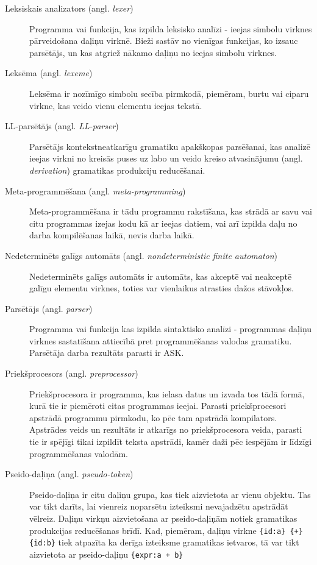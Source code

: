 \begin{description}
\item[Leksiskais analizators (angl. \emph{lexer})]
Programma vai funkcija, kas izpilda leksisko analīzi - ieejas simbolu virknes pārveidošana daļiņu virknē. Bieži sastāv no vienīgas funkcijas, ko izsauc parsētājs, un kas atgriež nākamo daļiņu no ieejas simbolu virknes.

\item[Leksēma (angl. \emph{lexeme})]
Leksēma ir nozīmīgo simbolu secība pirmkodā, piemēram, burtu vai ciparu virkne, kas veido vienu elementu ieejas tekstā.

\item[LL-parsētājs (angl. \emph{LL-parser})]
Parsētājs kontekstneatkarīgu gramatiku apakškopas parsēšanai, kas analizē ieejas virkni no kreisās puses uz labo un veido kreiso atvasinājumu (angl. \emph{derivation}) gramatikas produkciju reducēšanai.

\item[Meta-programmēšana (angl. \emph{meta-programming})]
Meta-programmēšana ir tādu programmu rakstīšana, kas strādā ar savu vai citu programmas izejas kodu kā ar ieejas datiem, vai arī izpilda daļu no darba kompilēšanas laikā, nevis darba laikā.

\item[Nedeterminēts galīgs automāts (angl. \emph{nondeterministic finite automaton})]
Nedeterminēts galīgs automāts ir automāts, kas akceptē vai neakceptē galīgu elementu virknes, toties var vienlaikus atrasties dažos stāvokļos.~\cite{Hopcroft:IntroAutomataTheory}

\item[Parsētājs (angl. \emph{parser})]
Programma vai funkcija kas izpilda sintaktisko analīzi - programmas daļiņu virknes sastatīšana attiecībā pret programmēšanas valodas gramatiku. Parsētāja darba rezultāts parasti ir ASK.

\item[Priekšprocesors (angl. \emph{preprocessor})]
Priekšprocesora ir programma, kas ielasa datus un izvada tos tādā formā, kurā tie ir piemēroti citas programmas ieejai. Parasti priekšprocesori apstrādā programmu pirmkodu, ko pēc tam apstrādā kompilators. Apstrādes veids un rezultāts ir atkarīgs no priekšprocesora veida, parasti tie ir spējīgi tikai izpildīt teksta apstrādi, kamēr daži pēc iespējām ir līdzīgi programmēšanas valodām.

\item[Pseido-daļiņa (angl. \emph{pseudo-token})]
Pseido-daļiņa ir citu daļiņu grupa, kas tiek aizvietota ar vienu objektu. Tas var tikt darīts, lai vienreiz noparsētu izteiksmi nevajadzētu apstrādāt vēlreiz. Daļiņu virkņu aizvietošana ar pseido-daļiņām notiek gramatikas produkcijas reducēšanas brīdī. Kad, piemēram, daļiņu virkne \texttt{\{id:a\} \{+\} \{id:b\}} tiek atpazīta ka derīga izteiksme gramatikas ietvaros, tā var tikt aizvietota ar pseido-daļiņu \texttt{\{expr:a + b\}}


\end{description}
